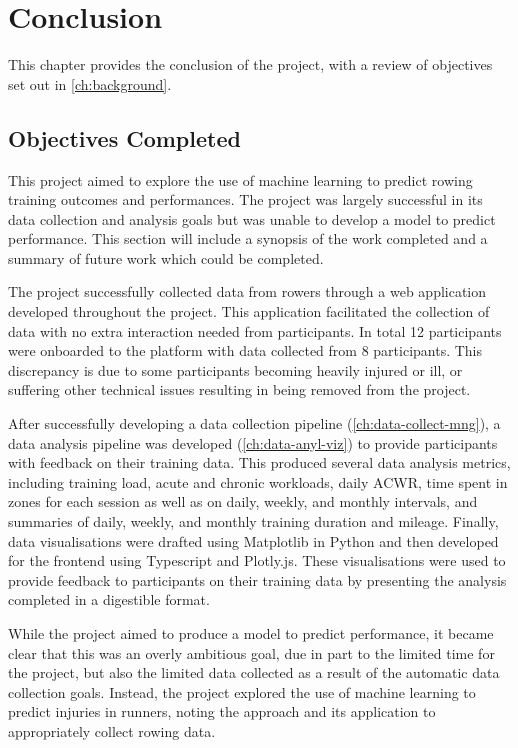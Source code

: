 \chapter{Conclusion}
This chapter provides the conclusion of the project, with a review of objectives set out in \autoref{ch:background}.


\section{Objectives Completed}
This project aimed to explore the use of machine learning to predict rowing training outcomes and performances. The project was largely successful in its data collection and analysis goals but was unable to develop a model to predict performance. This section will include a synopsis of the work completed and a summary of future work which could be completed. 

The project successfully collected data from rowers through a web application developed throughout the project. This application facilitated the collection of data with no extra interaction needed from participants. In total 12 participants were onboarded to the platform with data collected from 8 participants. This discrepancy is due to some participants becoming heavily injured or ill, or suffering other technical issues resulting in being removed from the project. 

After successfully developing a data collection pipeline (\autoref{ch:data-collect-mng}), a data analysis pipeline was developed (\autoref{ch:data-anyl-viz}) to provide participants with feedback on their training data. This produced several data analysis metrics, including training load, acute and chronic workloads, daily ACWR, time spent in zones for each session as well as on daily, weekly, and monthly intervals, and summaries of daily, weekly, and monthly training duration and mileage. Finally, data visualisations were drafted using Matplotlib in Python and then developed for the frontend using Typescript and Plotly.js. These visualisations were used to provide feedback to participants on their training data by presenting the analysis completed in a digestible format.

While the project aimed to produce a model to predict performance, it became clear that this was an overly ambitious goal, due in part to the limited time for the project, but also the limited data collected as a result of the automatic data collection goals. Instead, the project explored the use of machine learning to predict injuries in runners, noting the approach and its application to appropriately collect rowing data.

